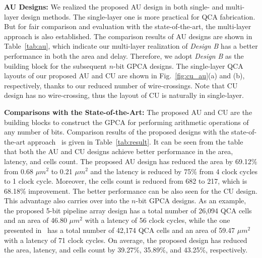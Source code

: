 \documentclass[9pt,journal,compsoc]{IEEEtran}
\begin{document}
\textbf{AU Designs:}
We realized the proposed AU design in both single- and multi-layer design methods.
The single-layer one is more practical for QCA fabrication. 
But for fair comparison and evaluation with the state-of-the-art, the multi-layer approach is also established.
The comparison results of AU designs are shown in Table~\ref{tab:au}, which indicate our multi-layer realization of  \emph{Design B} has a better performance in both the area and delay. 
Therefore, we adopt \emph{Design B} as the building block for the subsequent $n$-bit GPCA designs.
The single-layer QCA layouts of our proposed AU and CU are shown in Fig.~\ref{fig:cu_au}(a) and (b), respectively, thanks to our reduced number of wire-crossings. Note that CU design has no wire-crossing, thus the layout of CU is naturally in single-layer. 

\textbf{Comparisons with the State-of-the-Art:}
The proposed AU and CU are the building blocks to construct the GPCA for performing arithmetic operations of any number of bits.
Comparison results of the proposed designs with the state-of-the-art approach~\cite{2} is given in Table~\ref{tab:result}.
It can be seen from the table that both the AU and CU designs achieve better performance in the area, latency, and cells count.
The proposed AU design has reduced the area by 69.12\% from 0.68 $\mu m^2$ to 0.21 $\mu m^2$ and the latency is reduced by 75\% from 4 clock cycles to 1 clock cycle. Moreover, the cells count is reduced from 682 to 217, which is 68.18\% improvement. The better performance can be also seen for the CU design.    
This advantage also carries over into the $n$-bit GPCA designs. As an example, the proposed 5-bit pipeline array design has a total number of 26,094 QCA cells and an area of 46.80 $\mu m^2$ with a latency of 56 clock cycles, while the one presented in~\cite{2} has a total number of 42,174 QCA cells and an area of 59.47 $\mu m^2$ with a latency of 71 clock cycles. On average, the proposed design has reduced the area, latency, and cells count by 39.27\%, 35.89\%, and 43.25\%, respectively.  
\end{document}
